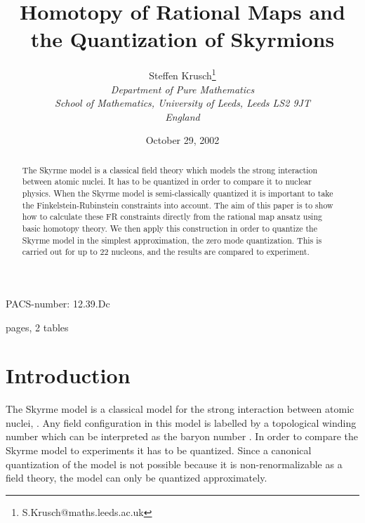\documentclass[a4paper,12pt]{article}
\begin{document}
\title{
  \vskip 15pt
  {\bf \Large \bf Homotopy of Rational Maps and the
    Quantization of Skyrmions}
  \vskip 10pt}
\author{
Steffen Krusch\thanks{S.Krusch@maths.leeds.ac.uk } \\[5pt]
{\normalsize {\sl Department of Pure Mathematics }}\\
{\normalsize {\sl School of Mathematics, University of Leeds,
Leeds LS2 9JT}}\\
{\normalsize {\sl England}} 
}

\date{October 29, 2002}

\maketitle

\begin{abstract}
The Skyrme model is a classical field theory which models the strong 
interaction between atomic nuclei. It has to be quantized in order to 
compare it to nuclear physics. When the Skyrme model is semi-classically 
quantized it is important to take the Finkelstein-Rubinstein constraints 
into account. The aim of this paper is to show how to calculate these FR 
constraints directly from the rational map ansatz using basic homotopy 
theory. We then apply this construction in order to quantize the Skyrme 
model in the simplest approximation, the zero mode quantization. This is 
carried out for up to 22 nucleons, and the results are compared to 
experiment.
\end{abstract}

\vspace{2cm} 
\centerline{PACS-number: 12.39.Dc}
\vspace{2cm}
\begin{tt}
\pageref{lastref} pages, 2 tables
\end{tt}



\newpage

\section{Introduction}

The Skyrme model is a classical model for the strong interaction
between atomic nuclei, \cite{Skyrme:1961vq}.  Any field configuration
in this model is labelled by a topological winding number which can be
interpreted as the baryon number \coordHE{}. In order to compare the Skyrme
model to experiments it has to be quantized.  Since a canonical
quantization of the model is not possible because it is
non-renormalizable as a field theory, the model can only be quantized
approximately. 
\end{document}
